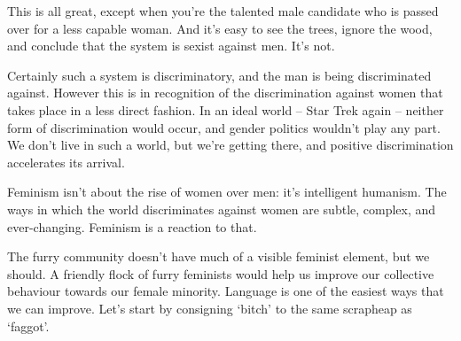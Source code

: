 This is all great, except when you're the talented male candidate who is passed over for a less capable woman. And it's easy to see the trees, ignore the wood, and conclude that the system is sexist against men. It's not.

Certainly such a system is discriminatory, and the man is being discriminated against. However this is in recognition of the discrimination against women that takes place in a less direct fashion. In an ideal world -- Star Trek again -- neither form of discrimination would occur, and gender politics wouldn't play any part. We don't live in such a world, but we're getting there, and positive discrimination accelerates its arrival.

Feminism isn't about the rise of women over men: it's intelligent humanism. The ways in which the world discriminates against women are subtle, complex, and ever-changing. Feminism is a reaction to that.

The furry community doesn't have much of a visible feminist element, but we should. A friendly flock of furry feminists would help us improve our collective behaviour towards our female minority. Language is one of the easiest ways that we can improve. Let's start by consigning `bitch' to the same scrapheap as `faggot'.
